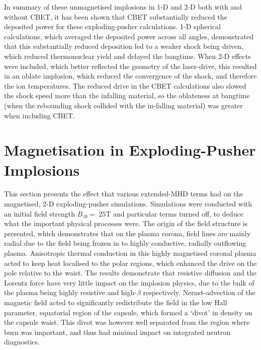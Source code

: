 In summary of these unmagnetised implosions in 1-D and 2-D both with and without \ac{CBET}, it has been shown that \ac{CBET} substantially reduced the deposited power for these exploding-pusher calculations.
1-D spherical calculations, which averaged the deposited power across all angles, demonstrated that this substantially reduced deposition led to a weaker shock being driven, which reduced thermonuclear yield and delayed the bangtime.
When 2-D effects were included, which better reflected the geometry of the laser-drive, this resulted in an oblate implosion, which reduced the convergence of the shock, and therefore the ion temperatures.
The reduced drive in the \ac{CBET} calculations also slowed the shock speed more than the infalling material, so the oblateness at bangtime (when the rebounding shock collided with the in-falling material) was greater when including \ac{CBET}.

\section{Magnetisation in Exploding-Pusher Implosions}%
\label{sec:Res2_mag_unmag}

This section presents the effect that various extended-\ac{MHD} terms had on the magnetised, 2-D exploding-pusher simulations.
Simulations were conducted with an initial field strength $B_{z0}=\ 25\text{T}$ and particular terms turned off, to deduce what the important physical processes were.
The origin of the field structure is presented, which demonstrates that on the plasma corona, field lines are mainly radial due to the field being frozen in to highly conductive, radially outflowing plasma.
Anisotropic thermal conduction in this highly magnetised coronal plasma acted to keep heat localised to the polar regions, which enhanced the drive on the pole relative to the waist.
The results demonstrate that resistive diffusion and the Lorentz force have very little impact on the implosion physics, due to the bulk of the plasma being highly resistive and high-$\beta$ respectively.
Nernst-advection of the magnetic field acted to significantly redistribute the field in the low Hall parameter, equatorial region of the capsule, which formed a `divot' in density on the capsule waist.
This divot was however well separated from the region where burn was important, and thus had minimal impact on integrated neutron diagnostics.

